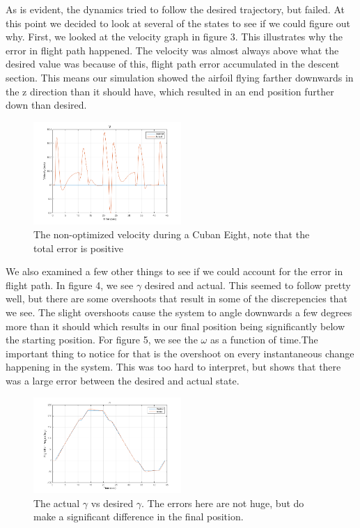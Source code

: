 \documentclass[journal]{IEEEtran}
\begin{document}
\indent As is evident, the dynamics tried to follow the desired trajectory, but failed. At this point we decided to look at several of the states to see if we could figure out why. First, we looked at the velocity graph in figure 3. This illustrates why the error in flight path happened. The velocity was almost always above what the desired value was because of this, flight path error accumulated in the descent section. This means our simulation showed the airfoil flying farther downwards
in the z direction than it should have, which resulted in an end position further down than desired.
\begin{figure}[h!]
    \centering
    \includegraphics[width=0.5\textwidth]{V_Constant_Gain_LQR.png}
    \caption{The non-optimized velocity during a Cuban Eight, note that the total error is positive}
\end{figure}
\indent We also examined a few other things to see if we could account for the error in flight path. In figure 4, we see $\gamma$ desired and actual. This seemed to follow pretty well, but there are some overshoots that result in some of the discrepencies that we see. The slight overshoots cause the system to angle downwards a few degrees more than it should which results in our final position being significantly below the starting position. For figure 5, we see the $\omega$ as a function of time.The important thing to notice for that is the overshoot on every instantaneous change happening in the system. This was too hard to interpret, but shows that there was a large error between the desired and actual state.
\begin{figure}[H]
    \centering
    \includegraphics[width=0.5\textwidth]{Gamma_Constant_Gain_LQR.png}
    \caption{The actual $\gamma$ vs desired $\gamma$. The errors here are not huge, but do make a significant difference in the final position.}
\end{figure}
\end{document}
